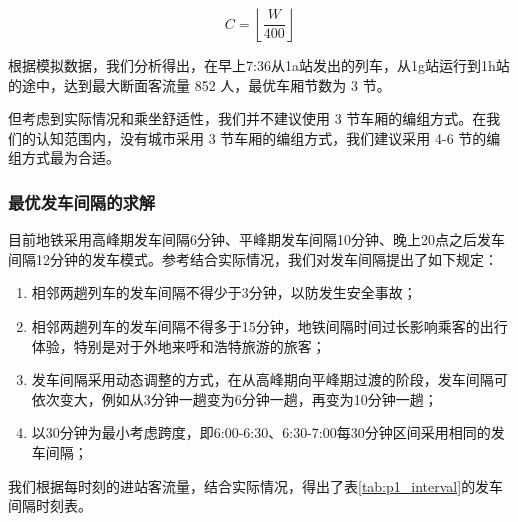 \documentclass[12pt,a4paper]{mcmthesis}
\begin{document}
    \begin{equation}
        C = \left\lfloor \frac{W}{400} \right\rfloor
        \label{eq:p1_def-max-car}
    \end{equation}

    根据模拟数据，我们分析得出，在早上7:36从1a站发出的列车，从1g站运行到1h站的途中，达到最大断面客流量 852 人，最优车厢节数为 3 节。

    但考虑到实际情况和乘坐舒适性，我们并不建议使用 3 节车厢的编组方式。在我们的认知范围内，没有城市采用 3 节车厢的编组方式，我们建议采用 4-6 节的编组方式最为合适。

    \subsubsection{最优发车间隔的求解}

    目前地铁采用高峰期发车间隔6分钟、平峰期发车间隔10分钟、晚上20点之后发车间隔12分钟的发车模式。参考\cite{发车间距}结合实际情况，我们对发车间隔提出了如下规定：

    \begin{enumerate}
        \item 相邻两趟列车的发车间隔不得少于3分钟，以防发生安全事故；
        \item 相邻两趟列车的发车间隔不得多于15分钟，地铁间隔时间过长影响乘客的出行体验，特别是对于外地来呼和浩特旅游的旅客；
        \item 发车间隔采用动态调整的方式，在从高峰期向平峰期过渡的阶段，发车间隔可依次变大，例如从3分钟一趟变为6分钟一趟，再变为10分钟一趟；
        \item 以30分钟为最小考虑跨度，即6:00-6:30、6:30-7:00每30分钟区间采用相同的发车间隔；
    \end{enumerate}

    我们根据每时刻的进站客流量，结合实际情况，得出了表\ref{tab:p1_interval}的发车间隔时刻表。
\end{document}
